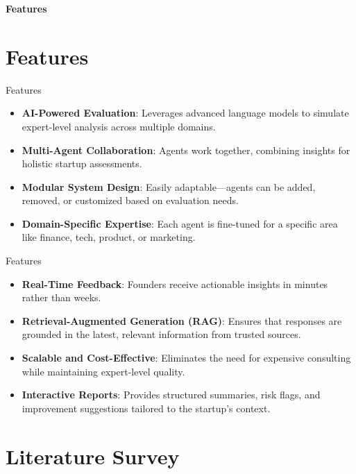 \documentclass{beamer}
\begin{document}
\begin{frame}{}
    \vfill
    \centering
    \Huge \textbf{Features}
    \vfill
\end{frame}
\section{Features}
\begin{frame}{Features}
\begin{itemize}
    \item \textbf{AI-Powered Evaluation}: Leverages advanced language models to simulate expert-level analysis across multiple domains.
    \item \textbf{Multi-Agent Collaboration}: Agents work together, combining insights for holistic startup assessments.
    \item \textbf{Modular System Design}: Easily adaptable—agents can be added, removed, or customized based on evaluation needs.
    \item \textbf{Domain-Specific Expertise}: Each agent is fine-tuned for a specific area like finance, tech, product, or marketing.
    
\end{itemize}
\end{frame}

\begin{frame}{Features}
\begin{itemize}
\item \textbf{Real-Time Feedback}: Founders receive actionable insights in minutes rather than weeks.
    \item \textbf{Retrieval-Augmented Generation (RAG)}: Ensures that responses are grounded in the latest, relevant information from trusted sources.
    \item \textbf{Scalable and Cost-Effective}: Eliminates the need for expensive consulting while maintaining expert-level quality.
    \item \textbf{Interactive Reports}: Provides structured summaries, risk flags, and improvement suggestions tailored to the startup's context.
   
\end{itemize}
\end{frame}





\section{Literature Survey}
\end{document}
